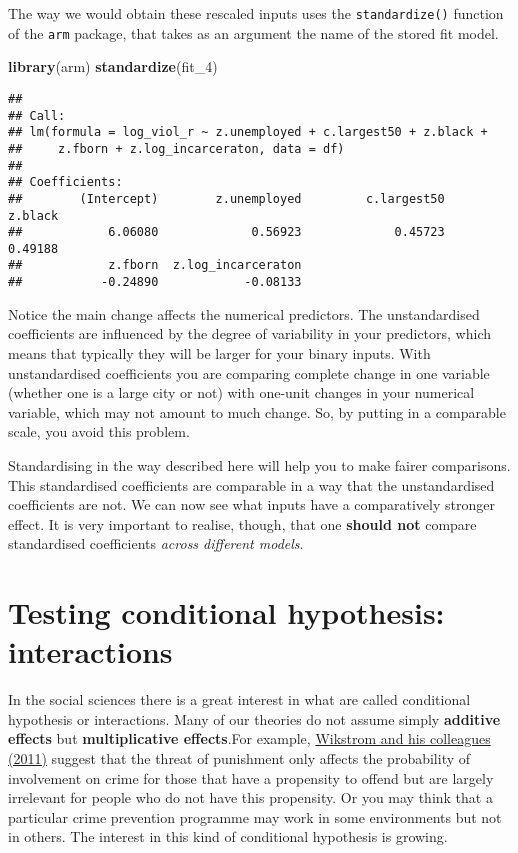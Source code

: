 \documentclass[
]{book}
\newenvironment{Shaded}{\begin{snugshade}}{\end{snugshade}}
\newcommand{\FunctionTok}[1]{\textcolor[rgb]{0.13,0.29,0.53}{\textbf{#1}}}
\newcommand{\NormalTok}[1]{#1}
\begin{document}
The way we would obtain these rescaled inputs uses the \texttt{standardize()} function of the \texttt{arm} package, that takes as an argument the name of the stored fit model.

\begin{Shaded}
\begin{Highlighting}[]
\FunctionTok{library}\NormalTok{(arm)}
\FunctionTok{standardize}\NormalTok{(fit\_4)}
\end{Highlighting}
\end{Shaded}

\begin{verbatim}
## 
## Call:
## lm(formula = log_viol_r ~ z.unemployed + c.largest50 + z.black + 
##     z.fborn + z.log_incarceraton, data = df)
## 
## Coefficients:
##        (Intercept)        z.unemployed         c.largest50             z.black  
##            6.06080             0.56923             0.45723             0.49188  
##            z.fborn  z.log_incarceraton  
##           -0.24890            -0.08133
\end{verbatim}

Notice the main change affects the numerical predictors. The unstandardised coefficients are influenced by the degree of variability in your predictors, which means that typically they will be larger for your binary inputs. With unstandardised coefficients you are comparing complete change in one variable (whether one is a large city or not) with one-unit changes in your numerical variable, which may not amount to much change. So, by putting in a comparable scale, you avoid this problem.

Standardising in the way described here will help you to make fairer comparisons. This standardised coefficients are comparable in a way that the unstandardised coefficients are not. We can now see what inputs have a comparatively stronger effect. It is very important to realise, though, that one \textbf{should not} compare standardised coefficients \emph{across different models}.

\section{Testing conditional hypothesis: interactions}\label{testing-conditional-hypothesis-interactions}

In the social sciences there is a great interest in what are called conditional hypothesis or interactions. Many of our theories do not assume simply \textbf{additive effects} but \textbf{multiplicative effects}.For example, \href{http://euc.sagepub.com/content/8/5/401.short}{Wikstrom and his colleagues (2011)} suggest that the threat of punishment only affects the probability of involvement on crime for those that have a propensity to offend but are largely irrelevant for people who do not have this propensity. Or you may think that a particular crime prevention programme may work in some environments but not in others. The interest in this kind of conditional hypothesis is growing.
\end{document}
